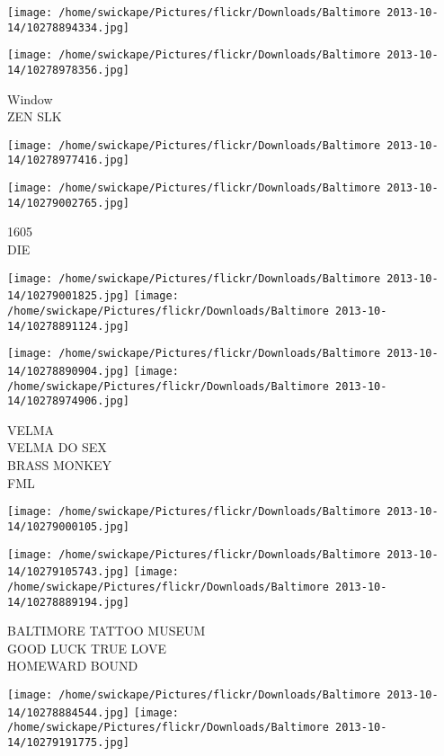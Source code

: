 \documentclass[10pt,letterpaper]{article}
\begin{document}
\texttt{[image: /home/swickape/Pictures/flickr/Downloads/Baltimore 2013-10-14/10278894334.jpg]}

\vspace{0.25in}
\texttt{[image: /home/swickape/Pictures/flickr/Downloads/Baltimore 2013-10-14/10278978356.jpg]}

Window\\
ZEN SLK\\
\pagebreak

\texttt{[image: /home/swickape/Pictures/flickr/Downloads/Baltimore 2013-10-14/10278977416.jpg]}

\vspace{0.25in}
\texttt{[image: /home/swickape/Pictures/flickr/Downloads/Baltimore 2013-10-14/10279002765.jpg]}

1605\\
DIE\\
\pagebreak

\texttt{[image: /home/swickape/Pictures/flickr/Downloads/Baltimore 2013-10-14/10279001825.jpg]}
\texttt{[image: /home/swickape/Pictures/flickr/Downloads/Baltimore 2013-10-14/10278891124.jpg]}

\texttt{[image: /home/swickape/Pictures/flickr/Downloads/Baltimore 2013-10-14/10278890904.jpg]}
\texttt{[image: /home/swickape/Pictures/flickr/Downloads/Baltimore 2013-10-14/10278974906.jpg]}

VELMA\\
VELMA DO SEX\\
BRASS MONKEY\\
FML\\
\pagebreak

\texttt{[image: /home/swickape/Pictures/flickr/Downloads/Baltimore 2013-10-14/10279000105.jpg]}

\vspace{0.25in}
\texttt{[image: /home/swickape/Pictures/flickr/Downloads/Baltimore 2013-10-14/10279105743.jpg]}
\texttt{[image: /home/swickape/Pictures/flickr/Downloads/Baltimore 2013-10-14/10278889194.jpg]}

BALTIMORE TATTOO MUSEUM\\
GOOD LUCK TRUE LOVE\\
HOMEWARD BOUND\\
\pagebreak

\texttt{[image: /home/swickape/Pictures/flickr/Downloads/Baltimore 2013-10-14/10278884544.jpg]}
\texttt{[image: /home/swickape/Pictures/flickr/Downloads/Baltimore 2013-10-14/10279191775.jpg]}
\end{document}
